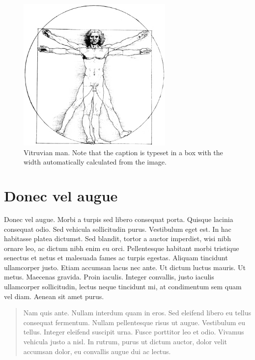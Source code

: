 \documentclass[cfonts,nofontsdir]{nostarch}
\begin{document}
\begin{figure}[tp]
  \includegraphics[width=3in]{vitruvian}
  \caption{Vitruvian man.  Note that the caption is typeset in a box
    with the width automatically calculated from the image.}
  \label{fig:one}
\end{figure}


\section{Donec vel augue}


Donec vel augue. Morbi a turpis sed libero consequat
porta. Quisque lacinia consequat odio. Sed vehicula sollicitudin
purus. Vestibulum eget est. In hac habitasse platea dictumst. Sed
blandit, tortor a auctor imperdiet, wisi nibh ornare leo, ac dictum
nibh enim eu orci.  Pellentesque habitant morbi tristique senectus et
netus et malesuada fames ac turpis egestas.  Aliquam tincidunt
ullamcorper justo. Etiam accumsan lacus nec ante.  Ut dictum luctus
mauris. Ut metus. Maecenas gravida. Proin iaculis.  Integer convallis,
justo iaculis ullamcorper sollicitudin, lectus neque tincidunt mi, at
condimentum sem quam vel diam. Aenean sit amet purus.
\begin{quote}
  Nam quis ante. Nullam interdum quam in eros.  Sed eleifend libero eu
  tellus consequat fermentum. Nullam pellentesque risus ut augue.
  Vestibulum eu tellus. Integer eleifend suscipit urna. Fusce
  porttitor leo et odio. Vivamus vehicula justo a nisl. In rutrum,
  purus ut dictum auctor, dolor velit accumsan dolor, eu convallis
  augue dui ac lectus. 
\end{quote}
\end{document}
